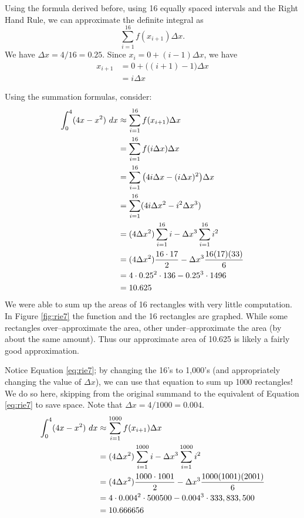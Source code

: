 {Using the formula derived before, using 16 equally spaced intervals and the Right Hand Rule, we can approximate the definite integral as $$\sum_{i=1}^{16}f(x_{i+1})\Delta x.$$
We have $\Delta x = 4/16 = 0.25$. Since $x_i = 0+(i-1)\Delta x$, we have 
\begin{align*}
x_{i+1} &= 0 + \big((i+1)-1\big)\Delta x \\
				&=	i\Delta x
\end{align*}

Using the summation formulas, consider:
\begin{align}
\int_0^4 (4x-x^2)\ dx &\approx \sum_{i=1}^{16} f(x_{i+1})\Delta x \notag\\
											&= \sum_{i=1}^{16} f(i\Delta x) \Delta x\notag\\
									&= \sum_{i=1}^{16} \big(4i\Delta x - (i\Delta x)^2\big)\Delta x\notag\\
									&= \sum_{i=1}^{16} (4i\Delta x^2 - i^2\Delta x^3)\notag\\		
									&= (4\Delta x^2)\sum_{i=1}^{16} i - \Delta x^3 \sum_{i=1}^{16} i^2 \label{eq:rie7}\\
									&= (4\Delta x^2)\frac{16\cdot 17}{2} - \Delta x^3 \frac{16(17)(33)}6 \notag\\
									&=	4\cdot 0.25^2\cdot 136-0.25^3\cdot 1496\notag\\
									&=10.625\notag
\end{align}
We were able to sum up the areas of 16 rectangles with very little computation. In Figure \ref{fig:rie7} the function and the 16 rectangles are graphed. While some rectangles over--approximate the area, other under--approximate the area (by about the same amount). Thus our approximate area of 10.625 is likely a fairly good approximation. 

Notice  Equation \eqref{eq:rie7}; by changing the 16's to 1,000's (and appropriately changing the value of $\Delta x$), we can use that equation to sum up 1000 rectangles!
\drawexampleline
{}
We do so here, skipping from the original summand to the equivalent of Equation \eqref{eq:rie7} to save space. Note that $\Delta x = 4/1000 = 0.004$.
\begin{align}
\int_0^4 (4x-x^2)\ dx &\approx \sum_{i=1}^{1000} f(x_{i+1})\Delta x \notag\\
									&= (4\Delta x^2)\sum_{i=1}^{1000} i - \Delta x^3 \sum_{i=1}^{1000} i^2 \notag\\
									&= (4\Delta x^2)\frac{1000\cdot 1001}{2} - \Delta x^3 \frac{1000(1001)(2001)}6 \notag\\
									&=	4\cdot 0.004^2\cdot 500500-0.004^3\cdot 333,833,500\notag\\
									&=10.666656\notag
\end{align}

}
